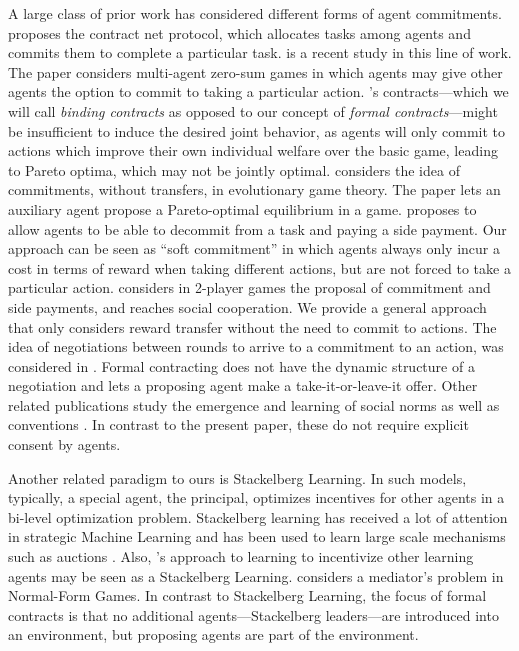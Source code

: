 \documentclass[referee,sn-basic]{sn-jnl}
\theoremstyle{thmstyleone}%
\theoremstyle{thmstyletwo}%
\theoremstyle{thmstylethree}%
\begin{document}
A large class of prior work has considered different forms of agent commitments. \cite{smith1980contract} proposes the contract net protocol, which allocates tasks among agents and commits them to complete a particular task. \cite{hughes2020learning} is a recent study in this line of work. The paper considers multi-agent zero-sum games in which agents may give other agents the option to commit to taking a particular action. \cite{hughes2020learning}'s contracts---which we will call \emph{binding contracts} as opposed to our concept of \emph{formal contracts}---might be insufficient to induce the desired joint behavior, as agents will only commit to actions which improve their own individual welfare over the basic game, leading to Pareto optima, which may not be jointly optimal. \cite{Han2017} considers the idea of commitments, without transfers, in evolutionary game theory. The paper \cite{mcaleer2021improving} lets an auxiliary agent propose a Pareto-optimal equilibrium in a game. \cite{sandholm1996advantages} proposes to allow agents to be able to decommit from a task and paying a side payment. Our approach can be seen as \enquote{soft commitment} in which agents always only incur a cost in terms of reward when taking different actions, but are not forced to take a particular action. \cite{sodomka2013coco} considers in 2-player games the proposal of commitment and side payments, and reaches social cooperation. We provide a general approach that only considers reward transfer without the need to commit to actions. The idea of negotiations between rounds to arrive to a commitment to an action, was considered in \cite{de2020strategic}. Formal contracting does not have the dynamic structure of a negotiation and lets a proposing agent make a take-it-or-leave-it offer. Other related publications study the emergence and learning of social norms \cite{vinitsky2021learning,koster2022spurious} as well as conventions \cite{koster2020model}. In contrast to the present paper, these do not require explicit consent by agents.

Another related paradigm to ours is Stackelberg Learning. In such models, typically, a special agent, the principal, optimizes incentives for other agents in a bi-level optimization problem. Stackelberg learning has received a lot of attention in strategic Machine Learning \cite{hardt2016strategic,milli2019social,zrnic2021leads} and has been used to learn large scale mechanisms such as auctions \cite{duetting,curry2022differentiable}. Also, \cite{yang2020learning}'s approach to learning to incentivize other learning agents may be seen as a Stackelberg Learning. \cite{kimplementation} considers a mediator's problem in Normal-Form Games. In contrast to Stackelberg Learning, the focus of formal contracts is that no additional agents---Stackelberg leaders---are introduced into an environment, but proposing agents are part of the environment.
\end{document}
